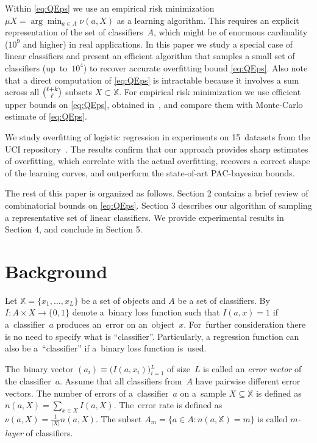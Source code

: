 \documentclass{article} %
\def\XX{\mathbb{X}}
\def\CC_#1^#2{\tbinom{#1}{#2}}
\begin{document}
Within \eqref{eq:QEps} we use an empirical risk minimization
$\mu X = \arg\min_{a \in A} \nu(a, X)$ as a learning algorithm.
This requires an explicit representation of the set of classifiers~$A$,
which might be of enormous cardinality ($10^9$ and higher) in real applications.
In this paper we study a special case of linear classifiers
and present an efficient algorithm that samples a small set of  classifiers (up~to~$10^4$)
to recover accurate overfitting bound \eqref{eq:QEps}.
Also note that a direct computation of \eqref{eq:QEps} is intractable
because it involves a sum across all $\CC_{\ell+k}^\ell$ subsets $X \subset \XX$.
For empirical risk minimization we use efficient upper bounds on \eqref{eq:QEps},
obtained in~\cite{voron11premi}, and compare them with Monte-Carlo estimate of \eqref{eq:QEps}.

We study overfitting of logistic regression in experiments on 15~datasets from the UCI repository~\cite{blake98uci}.
The results confirm that our approach provides sharp estimates of overfitting,
which correlate with the actual overfitting,
recovers a correct shape of the learning curves,
and outperform the state-of-art PAC-bayesian bounds.

The rest of this paper is organized as follows.
Section 2 contains a brief review of combinatorial bounds on \eqref{eq:QEps}.
Section 3 describes our algorithm of sampling a representative set of linear classifiers.
We provide experimental results in Section 4, and conclude in Section 5.

\section{Background}
\label{sec:Defs}

Let $\XX=\{x_1,\ldots,x_L\}$  be a set of objects and
$A$ be a set of classifiers.
By~$I\colon A\times X \to \{0,1\}$ denote a~binary loss function such that
$I(a,x)=1$ if a~classifier~$a$ produces an~error on an~object~$x$.
For~further consideration there is no need to specify what is ``classifier''.
Particularly, a regression function can also be a~``classifier''
if a~binary loss function is~used.

The~binary vector $(a_i)\equiv\bigl(I(a,x_i)\bigr){}_{i=1}^L$
of size~$L$ is called an \emph{error vector} of the classifier~$a$.
Assume that all classifiers from~$A$ have pairwise different error vectors.
The number of errors of a~classifier~$a$ on a~sample $X\subseteq\XX$
is defined as $n(a,X) = \sum_{x\in X} I(a,X)$.
The~error rate is defined as
$\nu(a,X) = \frac1{|X|} n(a,X)$.
The subset $A_m = \{a \in A \colon n(a, \XX) = m\}$ is called \emph{$m$-layer} of classifiers.
\end{document}
